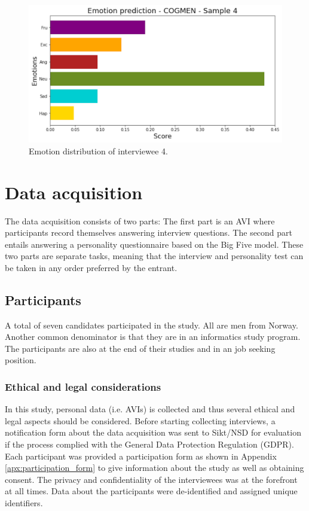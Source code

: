 %
\begin{equation*}
    [Conscientiousness, Agreeableness, Openness]
\end{equation*}
%
\newpage
%
\begin{figure}[h!]
  \centering
  \includegraphics[width=\textwidth]{figures/emotion_distribution_sample4.png}
  \caption{Emotion distribution of interviewee 4.}
  \label{fig:emotion_personality4}
\end{figure}
%

\section{Data acquisition}
\label{sec:data_aqusition}
The data acquisition consists of two parts: The first part is an AVI where participants record themselves answering interview questions. The second part entails answering a personality questionnaire based on the Big Five model. These two parts are separate tasks, meaning that the interview and personality test can be taken in any order preferred by the entrant. 

\subsection{Participants}
A total of seven candidates participated in the study. All are men from Norway. Another common denominator is that they are in an informatics study program. The participants are also at the end of their studies and in an job seeking position. 

\subsubsection{Ethical and legal considerations}
In this study, personal data (i.e. AVIs) is collected and thus several ethical and legal aspects should be considered. Before starting collecting interviews, a notification form about the data acquisition was sent to Sikt/NSD for evaluation if the process complied with the General Data Protection Regulation (GDPR). Each participant was provided a participation form as shown in Appendix \ref{apx:participation_form} to give information about the study as well as obtaining consent. The privacy and confidentiality of the interviewees was at the forefront at all times. Data about the participants were de-identified and assigned unique identifiers.  

